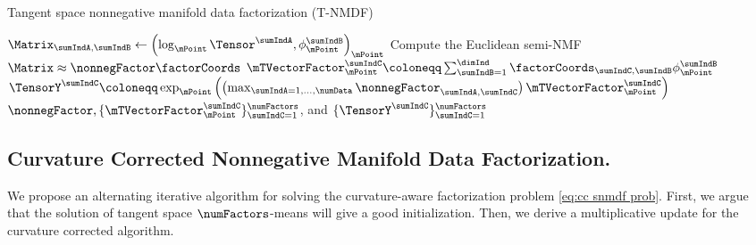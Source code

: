 \begin{algorithm}[t!]
\caption{Tangent space nonnegative manifold data factorization (T-NMDF)}
\label{alg:t-SNMDF}
\begin{algorithmic}[1]
\State $\Matrix_{\sumIndA, \sumIndB} \gets \left ( \log_\mPoint \Tensor^\sumIndA, \phi_\mPoint^\sumIndB \right )_\mPoint$
\EndFor
\EndFor
\State Compute the Euclidean semi-NMF $\Matrix \approx \nonnegFactor \factorCoords$
\State $\mTVectorFactor_\mPoint^\sumIndC \coloneqq \sum_{\sumIndB=1}^\dimInd \factorCoords_{\sumIndC, \sumIndB}\phi_{\mPoint}^\sumIndB$
\State $\TensorY^\sumIndC \coloneqq \exp_\mPoint \left ( \left(\max_{\sumIndA = 1, \dots, \numData} \nonnegFactor_{\sumIndA, \sumIndC}\right) \mTVectorFactor_\mPoint^\sumIndC \right )$
\EndFor
\State \Return $\nonnegFactor, \{\mTVectorFactor_\mPoint^\sumIndC\}_{\sumIndC=1}^\numFactors$, and $\{\TensorY^\sumIndC\}_{\sumIndC=1}^\numFactors$
\end{algorithmic}
\end{algorithm}

\subsection{Curvature Corrected Nonnegative Manifold Data Factorization.}
\label{sec:ccnmdf}
We propose an alternating iterative algorithm for solving the curvature-aware factorization problem \eqref{eq:cc snmdf prob}. First, we argue that the solution of tangent space $\numFactors$-means will give a good initialization. Then, we derive a multiplicative update for the curvature corrected algorithm.

